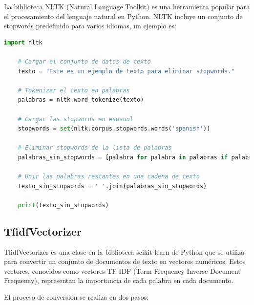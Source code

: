 La biblioteca NLTK (Natural Language Toolkit) es una herramienta popular para el procesamiento 
del lenguaje natural en Python. NLTK incluye un conjunto de stopwords predefinido para varios 
idiomas, un ejemplo es:

\begin{lstlisting}[style=mystylepython, language=Python, caption=bosque aleatorio con 500 árboles]
    import nltk

    # Cargar el conjunto de datos de texto
    texto = "Este es un ejemplo de texto para eliminar stopwords."
    
    # Tokenizar el texto en palabras
    palabras = nltk.word_tokenize(texto)
    
    # Cargar las stopwords en espanol
    stopwords = set(nltk.corpus.stopwords.words('spanish'))
    
    # Eliminar stopwords de la lista de palabras
    palabras_sin_stopwords = [palabra for palabra in palabras if palabra not in stopwords]
    
    # Unir las palabras restantes en una cadena de texto
    texto_sin_stopwords = ' '.join(palabras_sin_stopwords)
    
    print(texto_sin_stopwords)
\end{lstlisting}



\subsection{TfidfVectorizer}


TfidfVectorizer es una clase en la biblioteca scikit-learn de Python que se utiliza para 
convertir un conjunto de documentos de texto en vectores numéricos. Estos vectores, 
conocidos como vectores TF-IDF (Term Frequency-Inverse Document Frequency), representan la 
importancia de cada palabra en cada documento.

El proceso de conversión se realiza en dos pasos:

